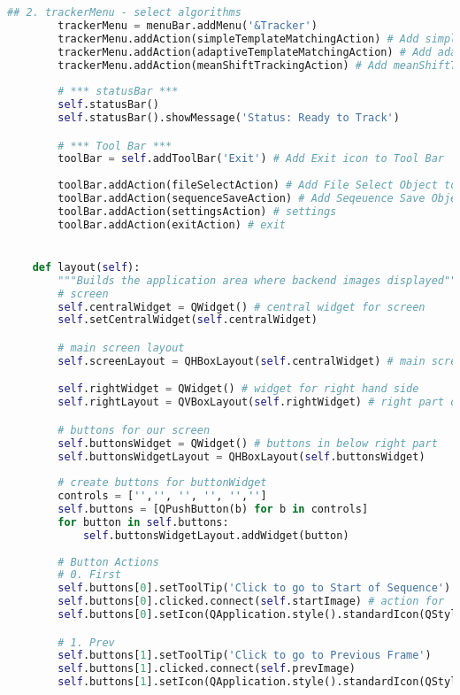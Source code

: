\begin{lstlisting}[language=Python, caption={GUI Impementation Code}, captionpos=b, label={lst:gui}]
        ## 2. trackerMenu - select algorithms
        trackerMenu = menuBar.addMenu('&Tracker')
        trackerMenu.addAction(simpleTemplateMatchingAction) # Add simpleTemplateMatchingAction to trackerMenu
        trackerMenu.addAction(adaptiveTemplateMatchingAction) # Add adaptiveTemplateMatchingAction to trackerMenu
        trackerMenu.addAction(meanShiftTrackingAction) # Add meanShiftTracking to algorithmMenu
        
        # *** statusBar ***
        self.statusBar()
        self.statusBar().showMessage('Status: Ready to Track')

        # *** Tool Bar ***
        toolBar = self.addToolBar('Exit') # Add Exit icon to Tool Bar  
        
        toolBar.addAction(fileSelectAction) # Add File Select Object to Tool Bar
        toolBar.addAction(sequenceSaveAction) # Add Seqeuence Save Object to Tool Bar
        toolBar.addAction(settingsAction) # settings
        toolBar.addAction(exitAction) # exit


    def layout(self):
        """Builds the application area where backend images displayed"""
        # screen
        self.centralWidget = QWidget() # central widget for screen
        self.setCentralWidget(self.centralWidget)

        # main screen layout
        self.screenLayout = QHBoxLayout(self.centralWidget) # main screen

        self.rightWidget = QWidget() # widget for right hand side
        self.rightLayout = QVBoxLayout(self.rightWidget) # right part of screen

        # buttons for our screen
        self.buttonsWidget = QWidget() # buttons in below right part
        self.buttonsWidgetLayout = QHBoxLayout(self.buttonsWidget)
        
        # create buttons for buttonWidget
        controls = ['','', '', '', '','']
        self.buttons = [QPushButton(b) for b in controls]
        for button in self.buttons:
            self.buttonsWidgetLayout.addWidget(button)
        
        # Button Actions
        # 0. First
        self.buttons[0].setToolTip('Click to go to Start of Sequence')
        self.buttons[0].clicked.connect(self.startImage) # action for 'start' button
        self.buttons[0].setIcon(QApplication.style().standardIcon(QStyle.SP_MediaSkipBackward))

        # 1. Prev
        self.buttons[1].setToolTip('Click to go to Previous Frame')
        self.buttons[1].clicked.connect(self.prevImage)
        self.buttons[1].setIcon(QApplication.style().standardIcon(QStyle.SP_MediaSeekBackward))


\end{lstlisting}

